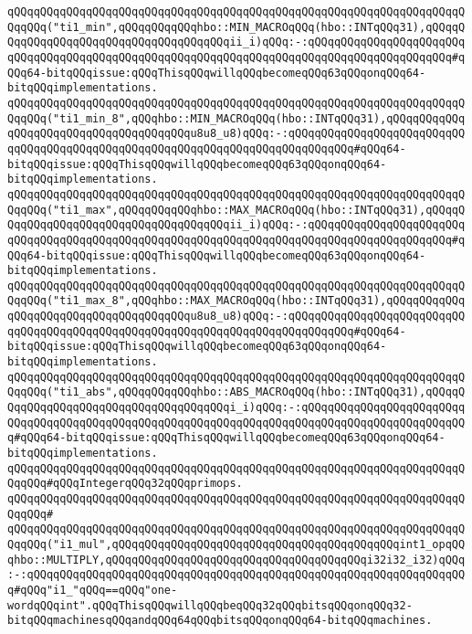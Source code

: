 \newline
\verb|qQQqqQQqqQQqqQQqqQQqqQQqqQQqqQQqqQQqqQQqqQQqqQQqqQQqqQQqqQQqqQQqqQQqqQQqqQQq("ti1_min",qQQqqQQqqQQqhbo::MIN_MACROqQQq(hbo::INTqQQq31),qQQqqQQqqQQqqQQqqQQqqQQqqQQqqQQqqQQqqQQqii_i)qQQq:-:qQQqqQQqqQQqqQQqqQQqqQQqqQQqqQQqqQQqqQQqqQQqqQQqqQQqqQQqqQQqqQQqqQQqqQQqqQQqqQQqqQQqqQQqqQQq#qQQq64-bitqQQqissue:qQQqThisqQQqwillqQQqbecomeqQQq63qQQqonqQQq64-bitqQQqimplementations.|\newline
\verb|qQQqqQQqqQQqqQQqqQQqqQQqqQQqqQQqqQQqqQQqqQQqqQQqqQQqqQQqqQQqqQQqqQQqqQQqqQQq("ti1_min_8",qQQqhbo::MIN_MACROqQQq(hbo::INTqQQq31),qQQqqQQqqQQqqQQqqQQqqQQqqQQqqQQqqQQqqQQqu8u8_u8)qQQq:-:qQQqqQQqqQQqqQQqqQQqqQQqqQQqqQQqqQQqqQQqqQQqqQQqqQQqqQQqqQQqqQQqqQQqqQQqqQQqqQQq#qQQq64-bitqQQqissue:qQQqThisqQQqwillqQQqbecomeqQQq63qQQqonqQQq64-bitqQQqimplementations.|\newline
\verb|qQQqqQQqqQQqqQQqqQQqqQQqqQQqqQQqqQQqqQQqqQQqqQQqqQQqqQQqqQQqqQQqqQQqqQQqqQQq("ti1_max",qQQqqQQqqQQqhbo::MAX_MACROqQQq(hbo::INTqQQq31),qQQqqQQqqQQqqQQqqQQqqQQqqQQqqQQqqQQqqQQqii_i)qQQq:-:qQQqqQQqqQQqqQQqqQQqqQQqqQQqqQQqqQQqqQQqqQQqqQQqqQQqqQQqqQQqqQQqqQQqqQQqqQQqqQQqqQQqqQQqqQQq#qQQq64-bitqQQqissue:qQQqThisqQQqwillqQQqbecomeqQQq63qQQqonqQQq64-bitqQQqimplementations.|\newline
\verb|qQQqqQQqqQQqqQQqqQQqqQQqqQQqqQQqqQQqqQQqqQQqqQQqqQQqqQQqqQQqqQQqqQQqqQQqqQQq("ti1_max_8",qQQqhbo::MAX_MACROqQQq(hbo::INTqQQq31),qQQqqQQqqQQqqQQqqQQqqQQqqQQqqQQqqQQqqQQqu8u8_u8)qQQq:-:qQQqqQQqqQQqqQQqqQQqqQQqqQQqqQQqqQQqqQQqqQQqqQQqqQQqqQQqqQQqqQQqqQQqqQQqqQQqqQQq#qQQq64-bitqQQqissue:qQQqThisqQQqwillqQQqbecomeqQQq63qQQqonqQQq64-bitqQQqimplementations.|\newline
\newline
\verb|qQQqqQQqqQQqqQQqqQQqqQQqqQQqqQQqqQQqqQQqqQQqqQQqqQQqqQQqqQQqqQQqqQQqqQQqqQQq("ti1_abs",qQQqqQQqqQQqhbo::ABS_MACROqQQq(hbo::INTqQQq31),qQQqqQQqqQQqqQQqqQQqqQQqqQQqqQQqqQQqqQQqi_i)qQQq:-:qQQqqQQqqQQqqQQqqQQqqQQqqQQqqQQqqQQqqQQqqQQqqQQqqQQqqQQqqQQqqQQqqQQqqQQqqQQqqQQqqQQqqQQqqQQqqQQq#qQQq64-bitqQQqissue:qQQqThisqQQqwillqQQqbecomeqQQq63qQQqonqQQq64-bitqQQqimplementations.|\newline
\newline
\verb|qQQqqQQqqQQqqQQqqQQqqQQqqQQqqQQqqQQqqQQqqQQqqQQqqQQqqQQqqQQqqQQqqQQqqQQqqQQq#qQQqIntegerqQQq32qQQqprimops.|\newline
\verb|qQQqqQQqqQQqqQQqqQQqqQQqqQQqqQQqqQQqqQQqqQQqqQQqqQQqqQQqqQQqqQQqqQQqqQQqqQQq#|\newline
\verb|qQQqqQQqqQQqqQQqqQQqqQQqqQQqqQQqqQQqqQQqqQQqqQQqqQQqqQQqqQQqqQQqqQQqqQQqqQQq("i1_mul",qQQqqQQqqQQqqQQqqQQqqQQqqQQqqQQqqQQqqQQqqQQqint1_opqQQqhbo::MULTIPLY,qQQqqQQqqQQqqQQqqQQqqQQqqQQqqQQqqQQqqQQqi32i32_i32)qQQq:-:qQQqqQQqqQQqqQQqqQQqqQQqqQQqqQQqqQQqqQQqqQQqqQQqqQQqqQQqqQQqqQQqqQQq#qQQq"i1_"qQQq==qQQq"one-wordqQQqint".qQQqThisqQQqwillqQQqbeqQQq32qQQqbitsqQQqonqQQq32-bitqQQqmachinesqQQqandqQQq64qQQqbitsqQQqonqQQq64-bitqQQqmachines.|\newline
